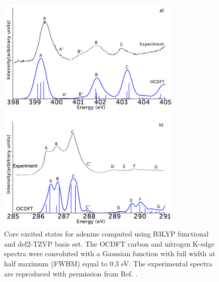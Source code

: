 \documentclass[12pt]{article}
\begin{document}
 \begin{figure}[!t]
\centering
\includegraphics[width=8.8cm]{figure_9.png}
\caption{Core excited states for adenine computed using B3LYP functional and def2-TZVP basis set. 
The OCDFT carbon and nitrogen K-edge spectra were convoluted with a Gaussian function with full width at half maximum (FWHM) equal to 0.3 eV.  The experimental spectra are reproduced with permission from Ref. .}
\label{figure:Adenine}
\end{figure} 
\end{document}
